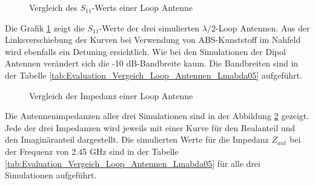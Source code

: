 \begin{figure}[t]
	\centering
	\begingroup
	
	\endgroup
	\caption{Vergleich des $S_{11}$-Werts einer Loop Antenne}
	\label{S11_Loop_Vergleich_Simulation}
\end{figure}

\newpage
Die Grafik \ref{S11_Loop_Vergleich_Simulation} zeigt die $S_{11}$-Werte der drei simulierten $\lambda/2$-Loop Antennen. Aus der Linksverschiebung der Kurven bei Verwendung von ABS-Kunststoff im Nahfeld wird ebenfalls ein Detuning ersichtlich. Wie bei den Simulationen der Dipol Antennen verändert sich die -10 dB-Bandbreite kaum. Die Bandbreiten sind in der Tabelle \ref{tab:Evaluation_Vergeich_Loop_Antennen_Lmabda05} aufgeführt.
\begin{figure}[!ht]
	\centering
	\begingroup
	
	\endgroup
	\caption{Vergleich der Impedanz einer Loop Antenne}
	\label{Impedanz_Loop_Vergleich_Simulation}
\end{figure}

\newpage
Die Antennenimpedanzen aller drei Simulationen sind in der Abbildung \ref{Impedanz_Loop_Vergleich_Simulation} gezeigt. Jede der drei Impedanzen wird jeweils mit einer Kurve für den Realanteil und den Imaginäranteil dargestellt. Die simulierten Werte für die Impedanz $Z_{ant}$ bei der Frequenz von 2.45 GHz sind in der Tabelle \ref{tab:Evaluation_Vergeich_Loop_Antennen_Lmabda05} für alle drei Simulationen aufgeführt.

\clearpage
\newpage

